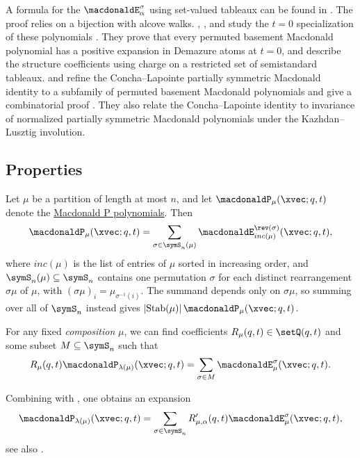A formula for the $\macdonaldE^\sigma_\alpha$ using
set-valued tableaux can be found in \cite[Thm.~2.2]{DaughertyRam2022x}.
The proof relies on a bijection with alcove walks.
, , and 
study the $t=0$ specialization of these polynomials
\cite{MandelshtamNiergarthSingh2026x}.  They prove that every permuted
basement Macdonald polynomial has a positive expansion in Demazure atoms at
$t=0$, and describe the structure coefficients using charge on a restricted
set of semistandard tableaux.
 and  refine the Concha--Lapointe
partially symmetric Macdonald identity to a subfamily of permuted basement
Macdonald polynomials and give a combinatorial proof \cite{OrrRivera2025x}.
They also relate the Concha--Lapointe identity to invariance of normalized
partially symmetric Macdonald polynomials under the Kazhdan--Lusztig
involution.


\subsection[macdonaldEpermProperties]{Properties}




\begin{proposition}
Let $\mu$ be a partition of length at most $n$, and let
$\macdonaldP_\mu(\xvec;q,t)$ denote the
\hyperref[macdonaldP]{Macdonald P polynomials}.
Then
\[
 \macdonaldP_\mu(\xvec;q,t)
 =
 \sum_{\sigma \in \symS_n(\mu)}
 \macdonaldE^{\rev(\sigma)}_{inc(\mu)}(\xvec;q,t),
\]
where $inc(\mu)$ is the list of entries of $\mu$ sorted in increasing order,
and $\symS_n(\mu)\subseteq\symS_n$ contains one permutation $\sigma$ for each
distinct rearrangement $\sigma\mu$ of $\mu$, with
$(\sigma\mu)_i=\mu_{\sigma^{-1}(i)}$.  The summand depends only on $\sigma\mu$,
so summing over all of $\symS_n$ instead gives
$\lvert\mathrm{Stab}(\mu)\rvert\,\macdonaldP_\mu(\xvec;q,t)$.
\end{proposition}


\begin{conjecture}
For any fixed \emph{composition} $\mu$, we can find
coefficients $R_{\mu}(q,t) \in \setQ(q,t)$ and some subset
$M \subseteq \symS_n$ such that
\[
R_{\mu}(q,t) \macdonaldP_{\lambda(\mu)}(\xvec;q,t)
= \sum_{\sigma \in M} \macdonaldE^{\sigma}_{\mu}(\xvec;q,t).
\]
\end{conjecture}
Combining \cite[Prop.~1.1]{GuoRam2021xSupp} with
\cite[Eq.~1.10]{GuoRam2021xSupp}, one obtains an expansion
\[
\macdonaldP_{\lambda(\mu)}(\xvec;q,t)
= \sum_{\sigma \in \symS_n}
R'_{\mu,\alpha}(q,t) \macdonaldE^{\sigma}_\mu(\xvec;q,t),
\]
see also \cite[Eq.~5.7.8]{Macdonald1996}.


